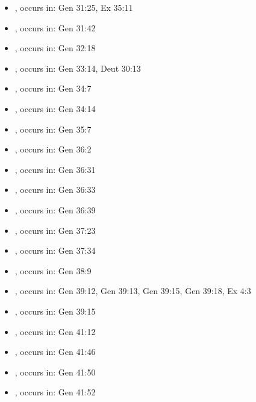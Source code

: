\documentclass[14pt]{article}
\begin{document}
\begin{itemize}
\item {}, occurs in: Gen 31:25, Ex 35:11

\item {}, occurs in: Gen 31:42

\item {}, occurs in: Gen 32:18

\item {}, occurs in: Gen 33:14, Deut 30:13

\item {}, occurs in: Gen 34:7

\item {}, occurs in: Gen 34:14

\item {}, occurs in: Gen 35:7

\item {}, occurs in: Gen 36:2

\item {}, occurs in: Gen 36:31

\item {}, occurs in: Gen 36:33

\item {}, occurs in: Gen 36:39

\item {}, occurs in: Gen 37:23

\item {}, occurs in: Gen 37:34

\item {}, occurs in: Gen 38:9

\item {}, occurs in: Gen 39:12, Gen 39:13, Gen 39:15, Gen 39:18, Ex 4:3

\item {}, occurs in: Gen 39:15

\item {}, occurs in: Gen 41:12

\item {}, occurs in: Gen 41:46

\item {}, occurs in: Gen 41:50

\item {}, occurs in: Gen 41:52


\end{itemize}
\end{document}
